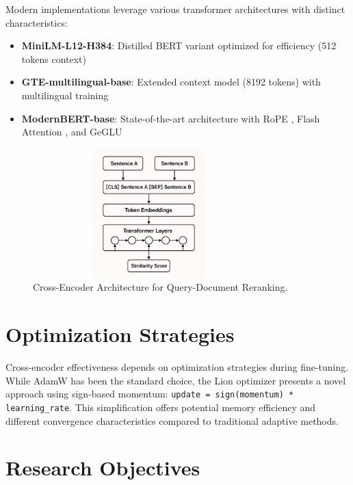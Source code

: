 Modern implementations leverage various transformer architectures with distinct characteristics:
\begin{itemize}
\item \textbf{MiniLM-L12-H384}: Distilled BERT variant optimized for efficiency \cite{wang2020minilm} (512 tokens context)
\item \textbf{GTE-multilingual-base}: Extended context model (8192 tokens) with multilingual training \cite{li2023towards}
\item \textbf{ModernBERT-base}: State-of-the-art architecture with RoPE \cite{su2023roformerenhancedtransformerrotary}, Flash Attention \cite{dao2022flashattentionfastmemoryefficientexact}, and GeGLU \cite{shazeer2020gluvariantsimprovetransformer} \cite{modernbert}
\end{itemize}

\begin{figure}[!htp]
    \centering
    \includegraphics[width=0.8\textwidth, height=5cm, keepaspectratio]{Figures/cross_encoder_archi.png}
    \caption{Cross-Encoder Architecture for Query-Document Reranking.}
    \label{fig:Cross-Encoder-Architecture}
\end{figure}

\section{Optimization Strategies}

Cross-encoder effectiveness depends on optimization strategies during fine-tuning. While AdamW \cite{loshchilov2019decoupled} has been the standard choice, the Lion optimizer \cite{chen2023symbolic} presents a novel approach using sign-based momentum: \texttt{update = sign(momentum) * learning\_rate}. This simplification offers potential memory efficiency and different convergence characteristics compared to traditional adaptive methods.

\section{Research Objectives}

